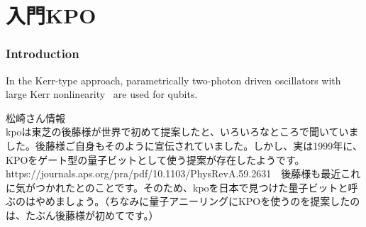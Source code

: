 \part{入門KPO}
\section{Introduction}
In the Kerr-type approach, parametrically two-photon
driven oscillators with large Kerr nonlinearity~\cite{PhysRevA.44.4704,PhysRevA.48.2494}
are used for qubits.

松崎さん情報\\
kpoは東芝の後藤様が世界で初めて提案したと、いろいろなところで聞いていました。後藤様ご自身もそのように宣伝されていました。しかし、実は1999年に、KPOをゲート型の量子ビットとして使う提案が存在したようです。https://journals.aps.org/pra/pdf/10.1103/PhysRevA.59.2631　後藤様も最近これに気がつかれたとのことです。そのため、kpoを日本で見つけた量子ビットと呼ぶのはやめましょう。（ちなみに量子アニーリングにKPOを使うのを提案したのは、たぶん後藤様が初めてです。）


